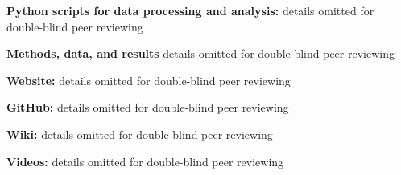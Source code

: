 \noindent
\textbf{Python scripts for data processing and analysis:}
details omitted for double-blind peer reviewing

\noindent
\textbf{Methods, data, and results}
details omitted for double-blind peer reviewing

\noindent
\textbf{Website:}
details omitted for double-blind peer reviewing

\noindent
\textbf{GitHub:} 
details omitted for double-blind peer reviewing

\noindent
\textbf{Wiki:}
details omitted for double-blind peer reviewing

\noindent
\textbf{Videos:}
details omitted for double-blind peer reviewing







